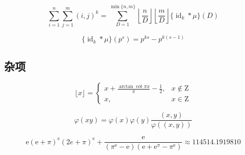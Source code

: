 \begin{equation}
    \sum_{i=1}^n\sum_{j=1}^m(i,j)^k=\sum_{D=1}^{\min\{n,m\}}\left\lfloor\frac{n}{D}\right\rfloor\left\lfloor\frac{m}{D}\right\rfloor\{\operatorname{id}_k*\mu\}(D)
\end{equation}

\begin{equation}
    \{\operatorname{id}_k*\mu\}(p^s)=p^{ks}-p^{k(s-1)}
\end{equation}

\subsection{杂项}

\begin{equation}
    \lfloor x\rfloor=\begin{cases}
        \displaystyle x+\frac{\arctan\cot\pi x}{\pi}-\frac{1}{2}, & x\notin\mathrm{Z} \\
        x,                                                        & x\in\mathrm{Z}
    \end{cases}
\end{equation}

\begin{equation}
    \varphi(xy)=\varphi(x)\varphi(y)\frac{(x,y)}{\varphi((x,y))}
\end{equation}

\begin{equation}
    \mathrm{e}(\mathrm{e}+\pi)^\mathrm{e}(2e + \pi)^\mathrm{e}+\frac{\mathrm{e}}{(\pi^\mathrm{e}-\mathrm{e})(\mathrm{e}+\mathrm{e}^\pi-\pi^\mathrm{e})}\approx 114514.1919810
\end{equation}
